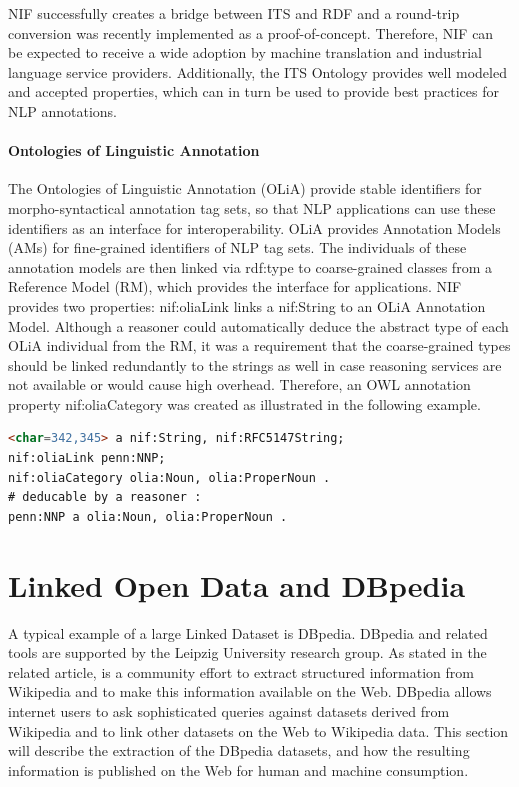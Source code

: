 \documentclass[thesis=M,english,hidelinks]{FITthesis}[2019/12/23]
\begin{document}
NIF successfully creates a bridge between ITS and RDF and a round-trip conversion was recently implemented as a proof-of-concept. Therefore, NIF can be expected to receive a wide adoption by machine translation and industrial language service providers. Additionally, the ITS Ontology provides well modeled and accepted properties, which can in turn be used to provide best practices for NLP annotations.

\paragraph{Ontologies of Linguistic Annotation}

The Ontologies of Linguistic Annotation (OLiA) provide stable identifiers for morpho-syntactical annotation tag sets, so that NLP applications can use these identifiers as an interface for interoperability. OLiA provides Annotation Models (AMs) for fine-grained identifiers of NLP tag sets. The
individuals of these annotation models are then linked via rdf:type to coarse-grained classes from a Reference Model (RM), which provides the interface for applications. NIF provides two properties: nif:oliaLink links a nif:String to an OLiA Annotation Model. Although a reasoner could automatically deduce the abstract type of each OLiA individual from the RM, it was a requirement that the coarse-grained types should be linked redundantly to the strings as well in case reasoning services are not available or would cause high overhead. Therefore, an OWL annotation property nif:oliaCategory was created as illustrated in the following example\cite{lst:olia-example}.

\begin{lstlisting}[language=HTML, caption=Example of Internationalization Tag Set HTML Code, label = {lst:olia-example}]
<char=342,345> a nif:String, nif:RFC5147String;
nif:oliaLink penn:NNP;
nif:oliaCategory olia:Noun, olia:ProperNoun .
# deducable by a reasoner :
penn:NNP a olia:Noun, olia:ProperNoun .
\end{lstlisting}


\section{Linked Open Data and DBpedia}

A typical example of a large Linked Dataset is DBpedia. DBpedia and related tools are supported by the Leipzig University research group. As stated in the related article, is a community effort to extract structured information from Wikipedia and to make this information available on the Web. DBpedia allows internet users to ask sophisticated queries against datasets derived from Wikipedia and to link other datasets on the Web to Wikipedia data. This section will describe the extraction of the DBpedia datasets, and how the resulting information is published on the Web for human and machine consumption.
\end{document}
